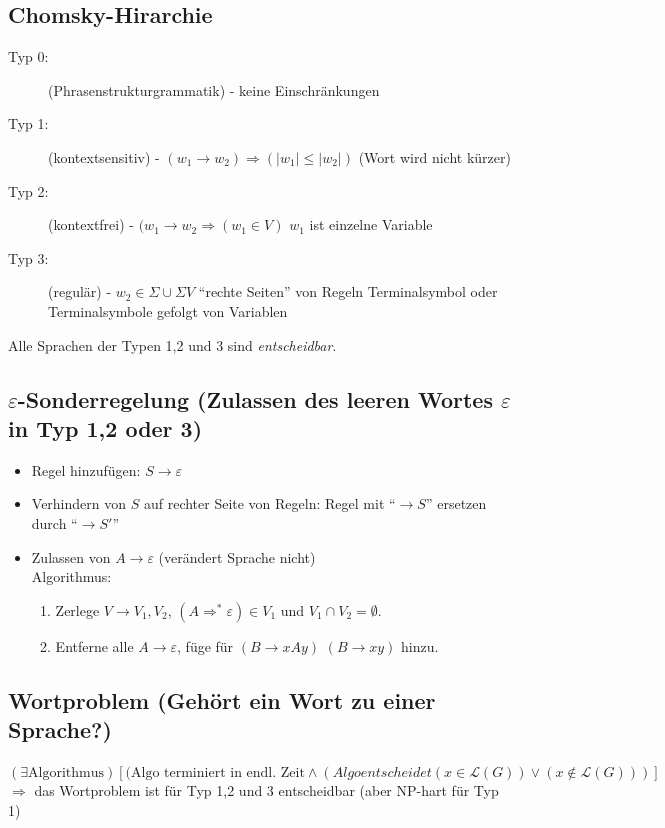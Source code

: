 \documentclass{scrartcl}
\begin{document}
\subsection*{Chomsky-Hirarchie}
\begin{description}
\item[Typ 0:] (Phrasenstrukturgrammatik) - keine Einschränkungen
\item[Typ 1:] (kontextsensitiv) - $(w_1\to w_2) \Rightarrow (\vert w_1 \vert \leq \vert w_2 \vert)$ {\tiny (Wort wird nicht kürzer)}
\item[Typ 2:] (kontextfrei) - $(w_1\to w_2 \Rightarrow (w_1\in V)$ {\tiny $w_1$ ist einzelne Variable}
\item[Typ 3:] (regulär) - $w_2\in\Sigma\cup\Sigma V$ {\tiny "`rechte Seiten"' von Regeln Terminalsymbol oder Terminalsymbole gefolgt von Variablen}
\end{description}
Alle Sprachen der Typen 1,2 und 3 sind \emph{entscheidbar}.

\subsection*{$\varepsilon$-Sonderregelung {\tiny (Zulassen des leeren Wortes $\varepsilon$ in Typ 1,2 oder 3)}}
\begin{itemize}
\item Regel hinzufügen: $S\to\varepsilon$
\item Verhindern von $S$ auf rechter Seite von Regeln: Regel mit "`$\to S$"' ersetzen durch "`$\to S'$"'
\item Zulassen von $A\to\varepsilon$ {\tiny (verändert Sprache nicht)}\\
Algorithmus:
\begin{enumerate}
\item Zerlege $V\to V_1,V_2$, $(A\Rightarrow^*\varepsilon)\in V_1$ und $V_1\cap V_2=\emptyset$.
\item Entferne alle $A\to\varepsilon$, füge für $(B\to xAy)$ $(B\to xy)$ hinzu.
\end{enumerate}
\end{itemize}

\subsection*{Wortproblem {\tiny (Gehört ein Wort zu einer Sprache?)}}
$(\exists \textrm{Algorithmus})[(\textrm{Algo terminiert in endl. Zeit}\wedge(Algo entscheidet (x\in\mathcal{L}(G))\vee(x\not\in\mathcal{L}(G)))]$ \\
$\Rightarrow$ das Wortproblem ist für Typ 1,2 und 3 entscheidbar (aber NP-hart für Typ 1)
\end{document}
